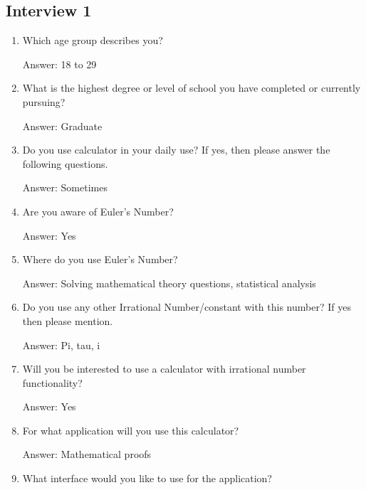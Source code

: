 \documentclass[12pt]{report}
\begin{document}
\vspace{\baselineskip}

\vspace{\baselineskip}
\subsection*{Interview 1}

\vspace{\baselineskip}
\begin{enumerate}
	\item Which age group describes you?\par

Answer: 18 to 29\par

	\item What is the highest degree or level of school you have completed or currently pursuing?\par

Answer: Graduate\par

	\item Do you use calculator in your daily use? If yes, then please answer the following questions.\par

Answer: Sometimes\par

	\item Are you aware of Euler's Number?\par

Answer: Yes\par

	\item Where do you use Euler's Number?\par

Answer: Solving mathematical theory questions, statistical analysis\par

	\item Do you use any other Irrational Number/constant with this number? If yes then please mention.\par

Answer: Pi, tau, i\par

	\item Will you be interested to use a calculator with irrational number functionality?\par

Answer: Yes\par

	\item For what application will you use this calculator?\par

Answer: Mathematical proofs\par

	\item What interface would you like to use for the application?
\end{enumerate}\par
\end{document}
